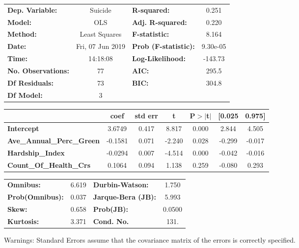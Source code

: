 \documentclass{report}
\begin{document}
\begin{center}
\begin{tabular}{lclc}
\toprule
\textbf{Dep. Variable:}           &     Suicide      & \textbf{  R-squared:         } &     0.251   \\
\textbf{Model:}                   &       OLS        & \textbf{  Adj. R-squared:    } &     0.220   \\
\textbf{Method:}                  &  Least Squares   & \textbf{  F-statistic:       } &     8.164   \\
\textbf{Date:}                    & Fri, 07 Jun 2019 & \textbf{  Prob (F-statistic):} &  9.30e-05   \\
\textbf{Time:}                    &     14:18:08     & \textbf{  Log-Likelihood:    } &   -143.73   \\
\textbf{No. Observations:}        &          77      & \textbf{  AIC:               } &     295.5   \\
\textbf{Df Residuals:}            &          73      & \textbf{  BIC:               } &     304.8   \\
\textbf{Df Model:}                &           3      & \textbf{                     } &             \\
\bottomrule
\end{tabular}
\begin{tabular}{lcccccc}
                                  & \textbf{coef} & \textbf{std err} & \textbf{t} & \textbf{P$>$$|$t$|$} & \textbf{[0.025} & \textbf{0.975]}  \\
\midrule
\textbf{Intercept}                &       3.6749  &        0.417     &     8.817  &         0.000        &        2.844    &        4.505     \\
\textbf{Ave\_Annual\_Perc\_Green} &      -0.1581  &        0.071     &    -2.240  &         0.028        &       -0.299    &       -0.017     \\
\textbf{Hardship\_Index}          &      -0.0294  &        0.007     &    -4.514  &         0.000        &       -0.042    &       -0.016     \\
\textbf{Count\_Of\_Health\_Crs}   &       0.1064  &        0.094     &     1.138  &         0.259        &       -0.080    &        0.293     \\
\bottomrule
\end{tabular}
\begin{tabular}{lclc}
\textbf{Omnibus:}       &  6.619 & \textbf{  Durbin-Watson:     } &    1.750  \\
\textbf{Prob(Omnibus):} &  0.037 & \textbf{  Jarque-Bera (JB):  } &    5.993  \\
\textbf{Skew:}          &  0.658 & \textbf{  Prob(JB):          } &   0.0500  \\
\textbf{Kurtosis:}      &  3.371 & \textbf{  Cond. No.          } &     131.  \\
\bottomrule
\end{tabular}
\end{center}

Warnings: \newline
 [1] Standard Errors assume that the covariance matrix of the errors is correctly specified.
\end{document}

